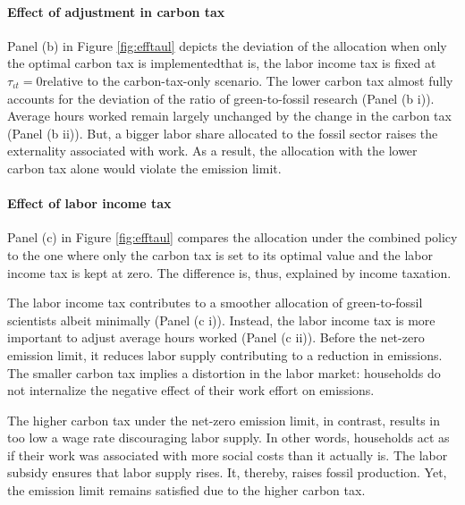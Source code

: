 \paragraph{Effect of adjustment in carbon tax}
Panel (b) in Figure \ref{fig:efftaul} depicts the deviation of the allocation when only the optimal carbon tax is implemented\textemdash that is, the labor income tax is fixed at $\tau_{\iota t}=0$\textemdash relative to the carbon-tax-only scenario. The lower carbon tax almost fully accounts for the deviation of the ratio of green-to-fossil research (Panel (b i)). Average hours worked remain largely unchanged by the change in the carbon tax (Panel (b ii)). But, a bigger labor share allocated to the fossil sector raises the externality associated with work. As a result, the allocation with the lower carbon tax alone would violate the emission limit. 


\paragraph{Effect of labor income tax}

Panel (c) in Figure \ref{fig:efftaul} compares the allocation under the combined policy to the one where only the carbon tax is set to its optimal value and the labor income tax is kept at zero. The difference is, thus, explained by income taxation. 

The labor income tax contributes to a smoother allocation of green-to-fossil scientists albeit minimally (Panel (c i)). 
Instead, the labor income tax is more important to adjust average hours worked (Panel (c ii)). Before the net-zero emission limit, it reduces labor supply contributing to a reduction in emissions. The smaller carbon tax implies a distortion in the labor market: households do not internalize the negative effect of their work effort on emissions. 

The higher carbon tax under the net-zero emission limit, in contrast, results in too low a wage rate discouraging labor supply. In other words, households act as if their work was associated with more social costs than it actually is. The labor subsidy ensures that labor supply rises. It, thereby, raises fossil production. Yet, the emission limit remains satisfied due to the higher carbon tax. %

